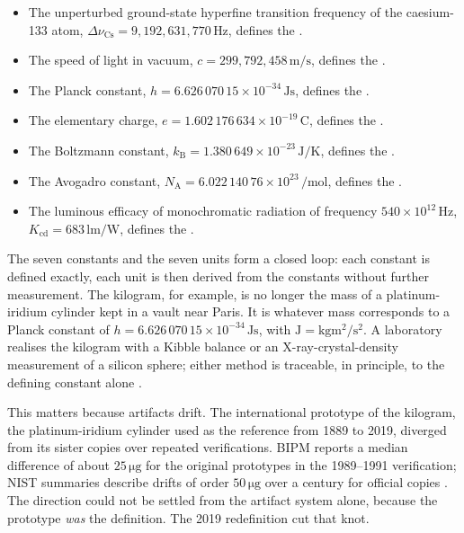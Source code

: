 \begin{itemize}[leftmargin=*]
  \item The unperturbed ground-state hyperfine transition frequency of
    the caesium-133 atom, $\Delta\nu_{\text{Cs}} = 9{,}192{,}631{,}770
    \,\si{\hertz}$, defines the .
  \item The speed of light in vacuum, $c = 299{,}792{,}458 \,\si{\meter
    \per\second}$, defines the .
  \item The Planck constant, $h = 6.626\,070\,15 \times 10^{-34}
    \,\si{\joule\second}$, defines the .
  \item The elementary charge, $e = 1.602\,176\,634 \times 10^{-19}
    \,\si{\coulomb}$, defines the .
  \item The Boltzmann constant, $k_{\text{B}} = 1.380\,649 \times
    10^{-23} \,\si{\joule\per\kelvin}$, defines the .
  \item The Avogadro constant, $N_{\text{A}} = 6.022\,140\,76 \times
    10^{23} \,\si{\per\mole}$, defines the .
  \item The luminous efficacy of monochromatic radiation of frequency
    $540 \times 10^{12} \,\si{\hertz}$, $K_{\text{cd}} = 683 \,\si
    {\lumen\per\watt}$, defines the .
\end{itemize}



The seven constants and the seven units form a closed loop: each
constant is defined exactly, each unit is then derived from the
constants without further measurement. The kilogram, for example, is
no longer the mass of a platinum-iridium cylinder kept in a vault near
Paris. It is whatever mass corresponds to a Planck constant of
$h = 6.626\,070\,15 \times 10^{-34} \,\si{\joule\second}$, with
$\si{\joule} = \si{\kilogram\meter\squared\per\second\squared}$. A
laboratory realises the kilogram with a Kibble balance or an
X-ray-crystal-density measurement of a silicon sphere; either method
is traceable, in principle, to the defining constant alone
\cite[ch.~2]{std:bipm-si2019}.

This matters because artifacts drift. The international prototype of
the kilogram, the platinum-iridium cylinder used as the reference from
1889 to 2019, diverged from its sister copies over repeated
verifications. BIPM reports a median difference of about $25 \,\si
{\micro\gram}$ for the original prototypes in the 1989--1991
verification; NIST summaries describe drifts of order
$50 \,\si{\micro\gram}$ over a century for official copies
\cite{std:bipm-si2019}. The direction could not be settled from the
artifact system alone, because the prototype \emph{was} the
definition. The 2019 redefinition cut that knot.

